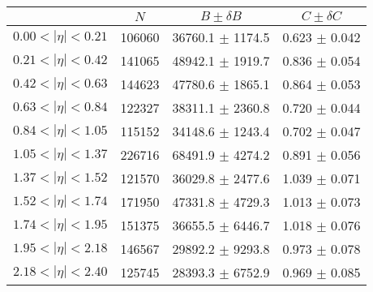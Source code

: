 \begin{tabular}{lccc}
\hline
    &   $N$   & $B \pm \delta B$  &  $C \pm \delta C$ \\
\hline
$0.00 < |\eta| <0.21$          & 106060     & 36760.1    $\pm$ 1174.5 & 0.623      $\pm$ 0.042 \\
$0.21 < |\eta| <0.42$          & 141065     & 48942.1    $\pm$ 1919.7 & 0.836      $\pm$ 0.054 \\
$0.42 < |\eta| <0.63$          & 144623     & 47780.6    $\pm$ 1865.1 & 0.864      $\pm$ 0.053 \\
$0.63 < |\eta| <0.84$          & 122327     & 38311.1    $\pm$ 2360.8 & 0.720      $\pm$ 0.044 \\
$0.84 < |\eta| <1.05$          & 115152     & 34148.6    $\pm$ 1243.4 & 0.702      $\pm$ 0.047 \\
$1.05 < |\eta| <1.37$          & 226716     & 68491.9    $\pm$ 4274.2 & 0.891      $\pm$ 0.056 \\
$1.37 < |\eta| <1.52$          & 121570     & 36029.8    $\pm$ 2477.6 & 1.039      $\pm$ 0.071 \\
$1.52 < |\eta| <1.74$          & 171950     & 47331.8    $\pm$ 4729.3 & 1.013      $\pm$ 0.073 \\
$1.74 < |\eta| <1.95$          & 151375     & 36655.5    $\pm$ 6446.7 & 1.018      $\pm$ 0.076 \\
$1.95 < |\eta| <2.18$          & 146567     & 29892.2    $\pm$ 9293.8 & 0.973      $\pm$ 0.078 \\
$2.18 < |\eta| <2.40$          & 125745     & 28393.3    $\pm$ 6752.9 & 0.969      $\pm$ 0.085 \\
\hline
\end{tabular}
